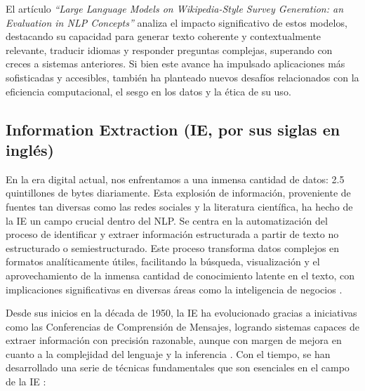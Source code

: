 El artículo \textit{``Large Language Models on Wikipedia-Style Survey Generation: an Evaluation in NLP Concepts''} \cite{Gao2023} 
analiza el impacto significativo de estos modelos, destacando su capacidad para generar 
texto coherente y contextualmente relevante, traducir idiomas y responder preguntas complejas, 
superando con creces a sistemas anteriores. Si bien este avance ha impulsado aplicaciones 
más sofisticadas y accesibles, también ha planteado nuevos desafíos relacionados con 
la eficiencia computacional, el sesgo en los datos y la ética de su uso.


\subsection{Information Extraction (IE, por sus siglas en inglés)}
En la era digital actual, nos enfrentamos a una inmensa cantidad de datos: 
2.5 quintillones de bytes diariamente. Esta explosión de información, proveniente 
de fuentes tan diversas como las redes sociales y la literatura científica, 
ha hecho de la IE un campo crucial dentro del NLP. Se centra en la automatización 
del proceso de identificar y extraer información estructurada a partir de texto 
no estructurado o semiestructurado. Este proceso transforma datos complejos en 
formatos analíticamente útiles, facilitando la búsqueda, visualización y 
el aprovechamiento de la inmensa cantidad de conocimiento latente en el texto, 
con implicaciones significativas en diversas áreas como la inteligencia de negocios \cite{Gursev2023}.

Desde sus inicios en la década de 1950, la IE ha evolucionado gracias a iniciativas 
como las Conferencias de Comprensión de Mensajes, logrando sistemas capaces de 
extraer información con precisión razonable, aunque con margen de mejora en cuanto 
a la complejidad del lenguaje y la inferencia \cite{Grishman1997}. Con el tiempo, se han 
desarrollado una serie de técnicas fundamentales que son esenciales en el campo de la IE \cite{Geek4geeks2024}:

